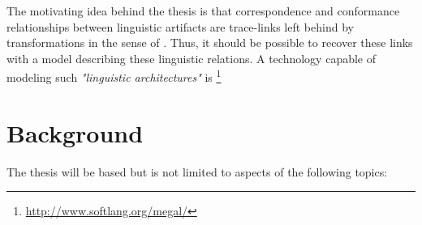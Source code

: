 \documentclass[runningheads,a4paper]{llncs}
\newcommand{\footnoteurl}[1]{\footnote{\url{#1}}}
\newcommand{\megal}{\text{MegaL}}
\begin{document}
The motivating idea behind the thesis is that correspondence and conformance relationships between linguistic artifacts are trace-links left behind by transformations in the sense of \cite{DBLP:conf/sle/Lammel16}.
Thus, it should be possible to recover these links with a model describing these linguistic relations.
A technology capable of modeling such \textit{"linguistic architectures"}\cite{DBLP:conf/models/FavreLV12} is \megal\footnoteurl{http://www.softlang.org/megal/} \cite{DBLP:conf/ecmdafa/LammelV14}

\section{Background}
\label{section:Background}
The thesis will be based but is not limited to aspects of the following topics:
\end{document}
